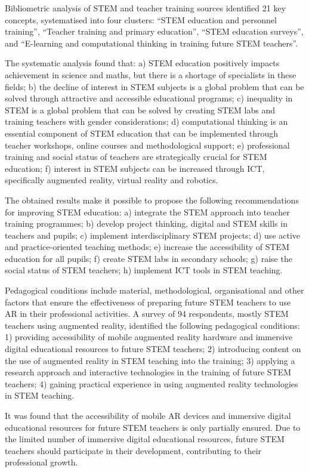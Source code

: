 {{Bibliometric analysis of STEM and teacher training sources identified 21 key concepts, systematised into four clusters: “STEM education and personnel training”, “Tea\-cher training and primary education”, “STEM education surveys”, and “E-learning and computational thinking in training future STEM teachers”.

The systematic analysis found that: a) 
STEM education positively impacts achievement in science and maths, but there is a shortage of specialists in these fields;
b) the decline of interest in STEM subjects is a global problem that can be solved through attractive and accessible educational programs;
c) inequality in STEM is a global problem that can be solved by creating STEM labs and training teachers with gender considerations;
d) computational thinking is an essential component of STEM education that can be implemented through teacher workshops, online courses and methodological support;
e) professional training and social status of teachers are strategically crucial for STEM education;
f) interest in STEM subjects can be increased through ICT, specifically augmented reality, virtual reality and robotics.  

The obtained results make it possible to propose the following recommendations for improving STEM education:
a) integrate the STEM approach into teacher training programmes; 
b) develop project thinking, digital and STEM skills in teachers and pupils;
c) implement interdisciplinary STEM projects;
d) use active and practice-oriented teaching methods;
e) increase the accessibility of STEM education for all pupils;
f) create STEM labs in secondary schools;
g) raise the social status of STEM teachers;
h) implement ICT tools in STEM teaching.

Pedagogical conditions include material, methodological, organisational and other factors that ensure the effectiveness of preparing future STEM teachers to use AR in their professional activities. A survey of 94 respondents, mostly STEM teachers using augmented reality, identified the following pedagogical conditions:
1) providing accessibility of mobile augmented reality hardware and immersive digital educational resources to future STEM teachers; 
2) introducing content on the use of augmented reality in STEM teaching into the training;
3) applying a research approach and interactive technologies in the training of future STEM teachers; 
4) gaining practical experience in using augmented reality technologies in STEM teaching.

It was found that the accessibility of mobile AR devices and immersive digital educational resources for future STEM teachers is only partially ensured. Due to the limited number of immersive digital educational resources, future STEM teachers should participate in their development, contributing to their professional growth.

}}
